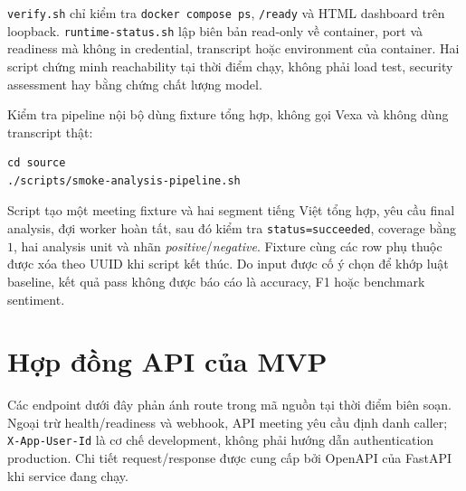 \texttt{verify.sh} chỉ kiểm tra \texttt{docker compose ps}, \texttt{/ready} và HTML dashboard trên loopback. \texttt{runtime-status.sh} lập biên bản read-only về container, port và readiness mà không in credential, transcript hoặc environment của container. Hai script chứng minh reachability tại thời điểm chạy, không phải load test, security assessment hay bằng chứng chất lượng model.

Kiểm tra pipeline nội bộ dùng fixture tổng hợp, không gọi Vexa và không dùng transcript thật:

\begin{lstlisting}[style=bashstyle, caption={Smoke test API--queue--worker--analytics}]
cd source
./scripts/smoke-analysis-pipeline.sh
\end{lstlisting}

Script tạo một meeting fixture và hai segment tiếng Việt tổng hợp, yêu cầu final analysis, đợi worker hoàn tất, sau đó kiểm tra \texttt{status=succeeded}, coverage bằng $1$, hai analysis unit và nhãn \textit{positive}/\textit{negative}. Fixture cùng các row phụ thuộc được xóa theo UUID khi script kết thúc. Do input được cố ý chọn để khớp luật baseline, kết quả pass không được báo cáo là accuracy, F1 hoặc benchmark sentiment.

\section{Hợp đồng API của MVP}
Các endpoint dưới đây phản ánh route trong mã nguồn tại thời điểm biên soạn. Ngoại trừ health/readiness và webhook, API meeting yêu cầu định danh caller; \texttt{X-App-User-Id} là cơ chế development, không phải hướng dẫn authentication production. Chi tiết request/response được cung cấp bởi OpenAPI của FastAPI khi service đang chạy.

